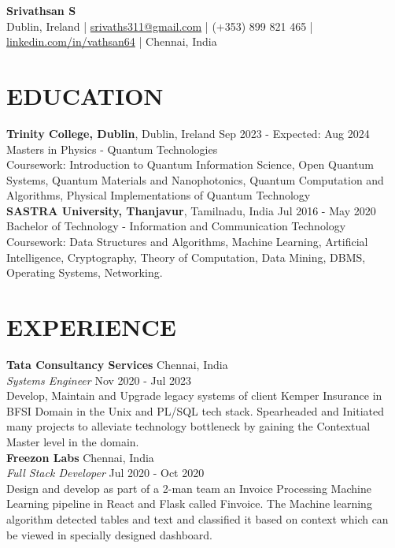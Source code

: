 \documentclass[a4paper,9pt]{extarticle}
\begin{document}
\pagestyle{empty}

\begin{center}
    \textbf{\Large Srivathsan S}\\[2pt] 
    Dublin, Ireland | \href{mailto:srivaths311@gmail.com}{srivaths311@gmail.com} | (+353) 899 821 465 | \href{https://www.linkedin.com/in/vathsan64}{linkedin.com/in/vathsan64} | Chennai,
    India 
\end{center}


\section*{EDUCATION}
\noindent
\textbf{Trinity College, Dublin}, Dublin, Ireland \hfill Sep 2023 - Expected: Aug 2024\\ 
Masters in Physics - Quantum Technologies\\
Coursework: Introduction to Quantum Information Science, Open Quantum Systems, Quantum Materials and Nanophotonics, Quantum Computation and
Algorithms, Physical Implementations of Quantum Technology\\

\noindent
\textbf{SASTRA University, Thanjavur}, Tamilnadu, India \hfill Jul 2016 - May 2020\\ 
Bachelor of Technology - Information and Communication Technology\\
Coursework: Data Structures and Algorithms, Machine Learning, Artificial Intelligence, Cryptography, Theory of Computation, Data Mining,
DBMS, Operating Systems, Networking.

\section*{EXPERIENCE}
\noindent
\textbf{Tata Consultancy Services} \hfill Chennai, India\\
\textit{Systems Engineer} \hfill Nov 2020 - Jul 2023\\
Develop, Maintain and Upgrade legacy systems of client Kemper Insurance in BFSI Domain in the Unix and PL/SQL tech stack.
Spearheaded and Initiated many projects to alleviate technology bottleneck by gaining the Contextual Master level in the
domain.\\

\noindent
\textbf{Freezon Labs} \hfill Chennai, India\\
\textit{Full Stack Developer} \hfill Jul 2020 - Oct 2020\\
Design and develop as part of a 2-man team an Invoice Processing Machine Learning pipeline in React and Flask called Finvoice.
The Machine learning algorithm detected tables and text and classified it based on context which can be viewed in specially designed dashboard.\\
\end{document}
